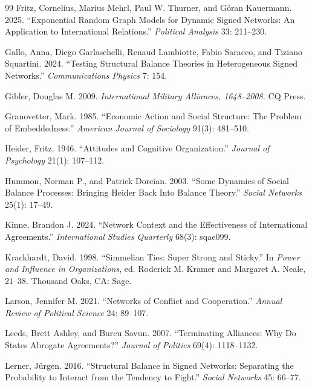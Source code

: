 \documentclass[Afour,sageh,times,doublespace]{sagej}
\begin{document}
\begin{thebibliography}{99}
 Fritz, Cornelius, Marius Mehrl, Paul W. Thurner, and G\"oran Kauermann. 2025. ``Exponential Random Graph Models for Dynamic Signed Networks: An Application to International Relations.'' \emph{Political Analysis} 33: 211--230.

 Gallo, Anna, Diego Garlaschelli, Renaud Lambiotte, Fabio Saracco, and Tiziano Squartini. 2024. ``Testing Structural Balance Theories in Heterogeneous Signed Networks.'' \emph{Communications Physics} 7: 154.

 Gibler, Douglas M. 2009. \emph{International Military Alliances, 1648--2008.} CQ Press.

 Granovetter, Mark. 1985. ``Economic Action and Social Structure: The Problem of Embeddedness.'' \emph{American Journal of Sociology} 91(3): 481--510.

 Heider, Fritz. 1946. ``Attitudes and Cognitive Organization.'' \emph{Journal of Psychology} 21(1): 107--112.

 Hummon, Norman P., and Patrick Doreian. 2003. ``Some Dynamics of Social Balance Processes: Bringing Heider Back Into Balance Theory.'' \emph{Social Networks} 25(1): 17--49.

 Kinne, Brandon J. 2024. ``Network Context and the Effectiveness of International Agreements.'' \emph{International Studies Quarterly} 68(3): sqae099.

 Krackhardt, David. 1998. ``Simmelian Ties: Super Strong and Sticky.'' In \emph{Power and Influence in Organizations}, ed. Roderick M. Kramer and Margaret A. Neale, 21--38. Thousand Oaks, CA: Sage.

 Larson, Jennifer M. 2021. ``Networks of Conflict and Cooperation.'' \emph{Annual Review of Political Science} 24: 89--107.

 Leeds, Brett Ashley, and Burcu Savun. 2007. ``Terminating Alliances: Why Do States Abrogate Agreements?'' \emph{Journal of Politics} 69(4): 1118--1132.

 Lerner, J\"urgen. 2016. ``Structural Balance in Signed Networks: Separating the Probability to Interact from the Tendency to Fight.'' \emph{Social Networks} 45: 66--77.


\end{thebibliography}
\end{document}
